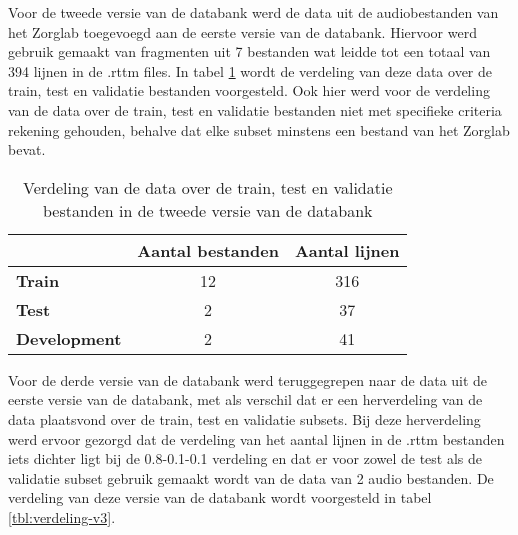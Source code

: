 Voor de tweede versie van de databank werd de data uit de audiobestanden van het Zorglab toegevoegd aan de eerste versie van de databank. Hiervoor werd gebruik gemaakt van fragmenten uit 7 bestanden wat leidde tot een totaal van 394 lijnen in de .rttm files. In tabel \ref{tbl:verdeling-v2} wordt de verdeling van deze data over de train, test en validatie bestanden voorgesteld. Ook hier werd voor de verdeling van de data over de train, test en validatie bestanden niet met specifieke criteria rekening gehouden, behalve dat elke subset minstens een bestand van het Zorglab bevat.

\begin{table}[]
    \begin{tabular}{@{}lcc@{}}
        \toprule
        & \multicolumn{1}{l}{\textbf{Aantal bestanden}} & \multicolumn{1}{l}{\textbf{Aantal lijnen}} \\ \midrule
        \textbf{Train}       & 12                                            & 316                                        \\
        \textbf{Test}        & 2                                             & 37                                         \\
        \textbf{Development} & 2                                             & 41                                         \\ \bottomrule
    \end{tabular}
    \caption[Verdeling data tweede versie databank]{\label{tbl:verdeling-v2}Verdeling van de data over de train, test en validatie bestanden in de tweede versie van de databank}
\end{table}

Voor de derde versie van de databank werd teruggegrepen naar de data uit de eerste versie van de databank, met als verschil dat er een herverdeling van de data plaatsvond over de train, test en validatie subsets. Bij deze herverdeling werd ervoor gezorgd dat de verdeling van het aantal lijnen in de .rttm bestanden iets dichter ligt bij de 0.8-0.1-0.1 verdeling en dat er voor zowel de test als de validatie subset gebruik gemaakt wordt van de data van 2 audio bestanden. De verdeling van deze versie van de databank wordt voorgesteld in tabel \ref{tbl:verdeling-v3}.

